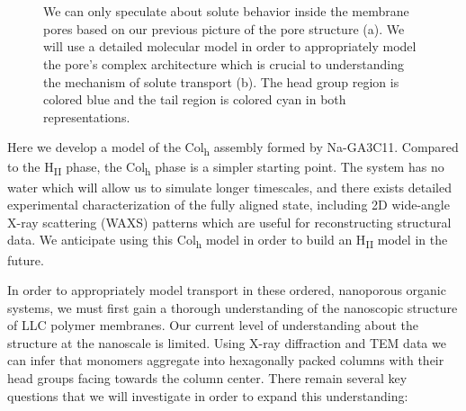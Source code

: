 \documentclass[journal=jpcbfk,manusciprt=article]{achemso}
\begin{document}
\begin{figure}
\begin{subfigure}{0.45\linewidth}
		\caption{}~\label{fig:detailed_pore}
	\end{subfigure}
  \caption{We can only speculate about solute behavior inside the membrane
	  pores based on our previous picture of the pore structure (a). 
          We will use a
	  detailed molecular model in order to appropriately model the pore's complex
	  architecture which is crucial to understanding the mechanism of solute
	  transport (b). The head group region is colored blue
	  and the tail region is colored cyan in both representations.}~\label{fig:detail}
  \end{figure}
 
  Here we develop a model of the Col\textsubscript{h} assembly formed by
  Na-GA3C11. Compared to the H\textsubscript{II} phase, the Col\textsubscript{h}
  phase is a simpler starting point. The system has no water which will allow us
  to simulate longer timescales, and there exists detailed experimental
  characterization of the fully aligned state, including 2D wide-angle X-ray
  scattering (WAXS) patterns which are useful for reconstructing structural data.
  We anticipate using this Col\textsubscript{h} model in order to build an 
  H\textsubscript{II} model in the future.

  In order to appropriately model transport in these ordered, nanoporous
  organic systems, we must first gain a thorough understanding of the nanoscopic
  structure of LLC polymer membranes. Our current level of understanding about
  the structure at the nanoscale is limited. Using X-ray diffraction and TEM data
  we can infer that monomers aggregate into hexagonally packed columns with their
  head groups facing towards the column center. There remain several key questions
  that we will investigate in order to expand this understanding: 
\end{document}
